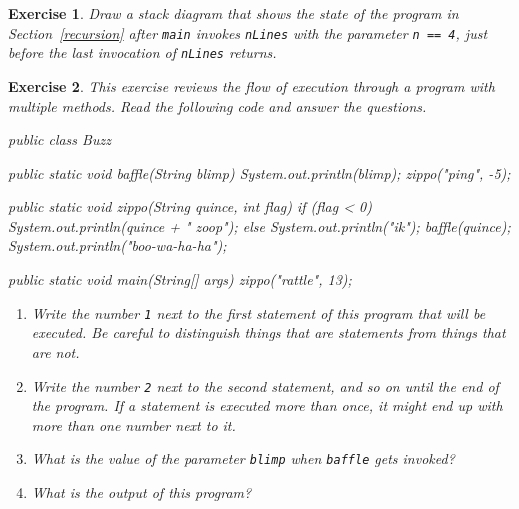 \documentclass[12pt]{book}
\theoremstyle{exercise}
\newtheorem{exercise}{Exercise}[chapter]
\newcommand{\java}[1]{\lstinline{#1}} %
\begin{document}
\begin{exercise}
Draw a stack diagram that shows the state of the program in Section~\ref{recursion} after \java{main} invokes \java{nLines} with the parameter \java{n == 4}, just before the last invocation of \java{nLines} returns.
\end{exercise}

\begin{exercise}
This exercise reviews the flow of execution through a program with multiple methods.
Read the following code and answer the questions.

\begin{code}
public class Buzz {

    public static void baffle(String blimp) {
        System.out.println(blimp);
        zippo("ping", -5);
    }

    public static void zippo(String quince, int flag) {
        if (flag < 0) {
            System.out.println(quince + " zoop");
        } else {
            System.out.println("ik");
            baffle(quince);
            System.out.println("boo-wa-ha-ha");
        }
    }

    public static void main(String[] args) {
        zippo("rattle", 13);
    }

}
\end{code}

\begin{enumerate}

\item Write the number {\tt 1} next to the first {\em statement} of this program that will be executed.
Be careful to distinguish things that are statements from things that are not.

\item Write the number {\tt 2} next to the second statement, and so on until the end of the program.
If a statement is executed more than once, it might end up with more than one number next to it.

\item What is the value of the parameter {\tt blimp} when {\tt baffle} gets invoked?

\item What is the output of this program?

\end{enumerate}
\end{exercise}


%
%
%
%
%
%
%
%
%

\backmatter
\appendix

%
%
%
%

\printindex
\cleardoublepage
\end{document}

